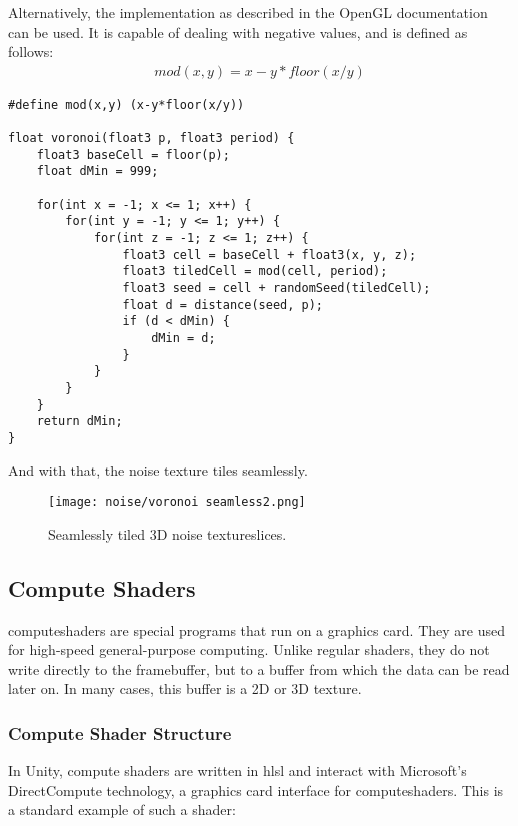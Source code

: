 \noindent
Alternatively, the implementation as described in the OpenGL documentation \cite{opengl:mod} can be used.
It is capable of dealing with negative values, and is defined as follows:
$$
\begin{array}{l}
    mod(x, y) = x - y * floor(x/y)
\end{array}
$$

\begin{lstlisting}[language=HLSL, caption=Implementation of seamless 3D Voronoi \gls{noise} algorithm., label=lst:shader:noise:voronoi:seamless2]
#define mod(x,y) (x-y*floor(x/y))

float voronoi(float3 p, float3 period) {
    float3 baseCell = floor(p);
    float dMin = 999;

    for(int x = -1; x <= 1; x++) {
        for(int y = -1; y <= 1; y++) {
            for(int z = -1; z <= 1; z++) {
                float3 cell = baseCell + float3(x, y, z);
                float3 tiledCell = mod(cell, period);
                float3 seed = cell + randomSeed(tiledCell);
                float d = distance(seed, p);
                if (d < dMin) {
                    dMin = d;
                }
            }
        }
    }
    return dMin;
}
\end{lstlisting}

\noindent
And with that, the \gls{noise} texture tiles seamlessly.

\begin{figure}[H]
    \texttt{[image: noise/voronoi seamless2.png]}
    \caption{Seamlessly tiled 3D \gls{noise} \gls{textureslice}s.}
    \label{img:rnd:noise:seamless2}
\end{figure}

\subsection{Compute Shaders}
\label{section:noise:compute}
\Gls{computeshader}s are special programs that run on a graphics card. They are used for high-speed general-purpose computing.
Unlike regular \gls{shader}s, they do not write directly to the \gls{framebuffer}, but to a buffer from which the data can be read later on.
In many cases, this buffer is a 2D or 3D texture.

\subsubsection{Compute Shader Structure}
In Unity, compute shaders are written in \gls{hlsl} and interact with Microsoft's DirectCompute technology, a graphics card interface for \gls{computeshader}s.
This is a standard example of such a \gls{shader}:

